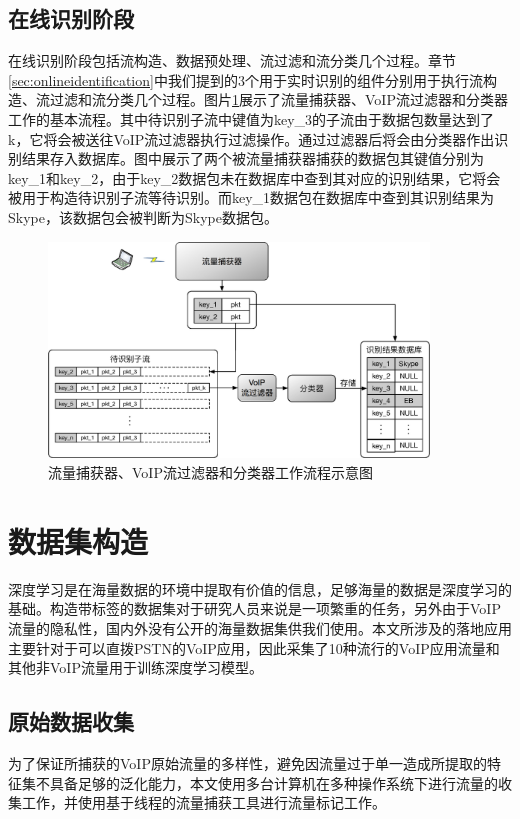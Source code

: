 \subsection{在线识别阶段}
在线识别阶段包括流构造、数据预处理、流过滤和流分类几个过程。章节\ref{sec:onlineidentification}中我们提到的3个用于实时识别的组件分别用于执行流构造、流过滤和流分类几个过程。图片\ref{fig:online_3_component}展示了流量捕获器、VoIP流过滤器和分类器工作的基本流程。其中待识别子流中键值为key\_3的子流由于数据包数量达到了k，它将会被送往VoIP流过滤器执行过滤操作。通过过滤器后将会由分类器作出识别结果存入数据库。图中展示了两个被流量捕获器捕获的数据包其键值分别为key\_1和key\_2，由于key\_2数据包未在数据库中查到其对应的识别结果，它将会被用于构造待识别子流等待识别。而key\_1数据包在数据库中查到其识别结果为Skype，该数据包会被判断为Skype数据包。

\begin{figure}[htp]
\begin{center}
\includegraphics[width=0.9\textwidth]{figures/online_3_component.eps}
\caption{流量捕获器、VoIP流过滤器和分类器工作流程示意图}\label{fig:online_3_component}
\end{center}
\end{figure}

\section{数据集构造}
深度学习是在海量数据的环境中提取有价值的信息，足够海量的数据是深度学习的基础。构造带标签的数据集对于研究人员来说是一项繁重的任务，另外由于VoIP流量的隐私性，国内外没有公开的海量数据集供我们使用。本文所涉及的落地应用主要针对于可以直拨PSTN的VoIP应用，因此采集了10种流行的VoIP应用流量和其他非VoIP流量用于训练深度学习模型。

\subsection{原始数据收集}
为了保证所捕获的VoIP原始流量的多样性，避免因流量过于单一造成所提取的特征集不具备足够的泛化能力，本文使用多台计算机在多种操作系统下进行流量的收集工作，并使用基于线程的流量捕获工具进行流量标记工作。


